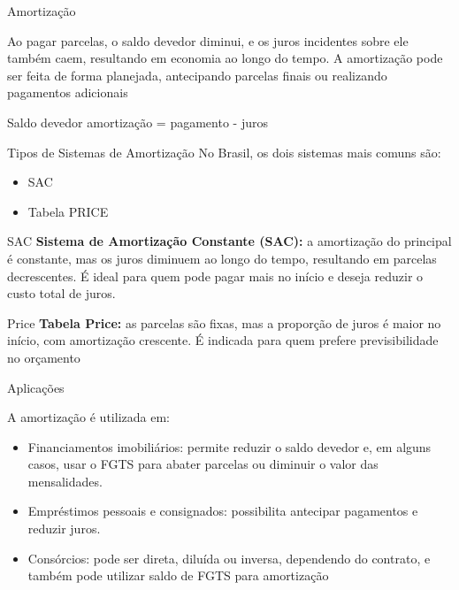 \documentclass{if-beamer}
\begin{document}
\begin{frame}[allowframebreaks]{Amortização}
    \begin{exampleblock}{}
        Ao pagar parcelas, o saldo devedor diminui, e os juros incidentes sobre ele também caem, resultando em
        economia ao longo do tempo. A amortização pode ser feita de forma planejada, antecipando parcelas finais
        ou realizando pagamentos adicionais 
    \end{exampleblock}
    
    \framebreak

    \begin{exampleblock}{Saldo devedor}
        amortização = pagamento - juros        
    \end{exampleblock}
\end{frame}

\begin{frame}[allowframebreaks]{Tipos de Sistemas de Amortização}
    No Brasil, os dois sistemas mais comuns são:
    \begin{itemize}
        \item SAC
        \item Tabela PRICE
    \end{itemize}

    \framebreak
    
    \begin{block}{SAC}
        \textbf{Sistema de Amortização Constante (SAC):} a amortização do principal é constante, mas os juros diminuem ao 
        longo do tempo, resultando em parcelas decrescentes. É ideal para quem pode pagar mais no início e 
        deseja reduzir o custo total de juros.            
    \end{block}
    
    \framebreak
    
    \begin{block}{Price}
        \textbf{Tabela Price:} as parcelas são fixas, mas a proporção de juros é maior no início, com amortização crescente.
        É indicada para quem prefere previsibilidade no orçamento
    \end{block}    
\end{frame}

\begin{frame}{Aplicações}
    \begin{block}{A amortização é utilizada em:}
        \begin{itemize}
            \item Financiamentos imobiliários: permite reduzir o saldo devedor e, em alguns casos, usar o FGTS para abater parcelas
            ou diminuir o valor das mensalidades.
            \item Empréstimos pessoais e consignados: possibilita antecipar pagamentos e reduzir juros.
            \item Consórcios: pode ser direta, diluída ou inversa, dependendo do contrato, e também pode utilizar saldo de FGTS para amortização
        \end{itemize}
    \end{block}
\end{frame}
\end{document}
